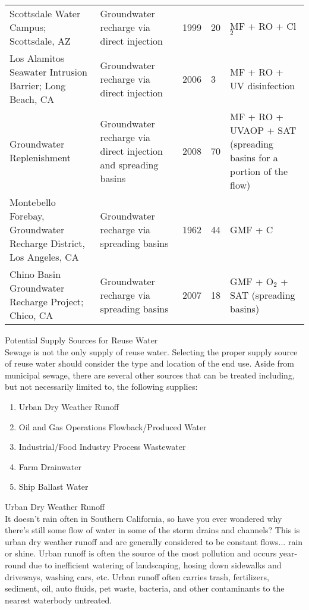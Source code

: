 \documentclass{article}
\begin{document}
\begin{table}[]
\begin{tabular}{lllll}
Scottsdale Water Campus; Scottsdale, AZ                            & Groundwater recharge via direct injection                      & 1999 & 20             & MF + RO + Cl$_2$ \\
Los Alamitos Seawater Intrusion Barrier; Long Beach, CA            & Groundwater recharge via direct injection                      & 2006 & 3              & MF + RO + UV disinfection                                          \\
Groundwater Replenishment                                          & Groundwater recharge via direct injection and spreading basins & 2008 & 70             & MF + RO + UVAOP + SAT (spreading basins for a portion of the flow) \\
Montebello Forebay, Groundwater Recharge District, Los Angeles, CA & Groundwater recharge via spreading basins                      & 1962 & 44             & GMF + C                                                            \\
Chino Basin Groundwater Recharge Project; Chico, CA                & Groundwater recharge via spreading basins                      & 2007 & 18             & GMF + O$_2$ + SAT (spreading basins)
\end{tabular}
\end{table}
Potential Supply Sources for Reuse Water\\
Sewage is not the only supply of reuse water.  Selecting the proper supply source of reuse water should consider the type and location of the end use.  Aside from municipal sewage, there are several other sources that can be treated including, but not necessarily limited to, the following supplies:\\
\begin{enumerate}
\item Urban Dry Weather Runoff
\item Oil and Gas Operations Flowback/Produced Water
\item Industrial/Food Industry Process Wastewater
\item Farm Drainwater
\item Ship Ballast Water
\end{enumerate}
 
Urban Dry Weather Runoff\\
It doesn't rain often in Southern California, so have you ever wondered why there's still some flow of water in some of the storm drains and channels?  This is urban dry weather runoff and are generally considered to be constant flows... rain or shine.  Urban runoff is often the source of the most pollution and occurs year-round due to inefficient watering of landscaping, hosing down sidewalks and driveways, washing cars, etc.  Urban runoff often carries trash, fertilizers, sediment, oil, auto fluids, pet waste, bacteria, and other contaminants to the nearest waterbody untreated.\\  
\end{document}
